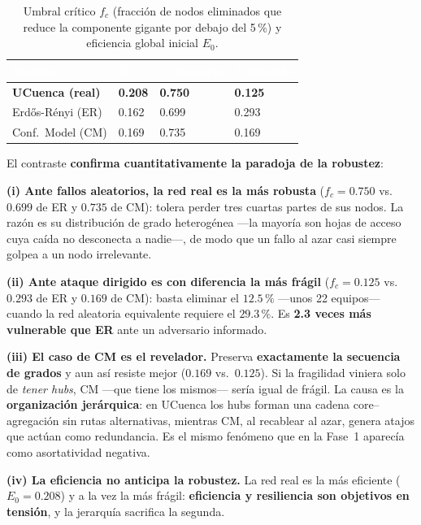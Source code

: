 \documentclass[11pt, a4paper]{article}
\newcommand{\encabezado}[1]{%
    \cellcolor{tabhead}\textcolor{white}{\textbf{#1}}}
\begin{document}
\begin{table}[htbp]
\centering
\caption{Umbral crítico $f_c$ (fracción de nodos eliminados que reduce la
         componente gigante por debajo del 5\,\%) y eficiencia global
         inicial $E_0$.}
\label{tab:percolacion_nulos}
\small
\begin{tabular}{L{3.4cm} C{2.4cm} C{2.6cm} C{2.6cm}}
    \toprule
    \encabezado{Modelo} & \encabezado{$E_0$} &
    \encabezado{$f_c$ aleatorio} & \encabezado{$f_c$ dirigido} \\
    \midrule
    \textbf{UCuenca (real)} & \textbf{0.208} & \textbf{0.750} & \textbf{0.125} \\
    Erdős-Rényi (ER)        & 0.162          & 0.699          & 0.293 \\
    Conf.\ Model (CM)       & 0.169          & 0.735          & 0.169 \\
    \bottomrule
\end{tabular}
\end{table}

El contraste \textbf{confirma cuantitativamente la paradoja de la robustez}:

\textbf{(i) Ante fallos aleatorios, la red real es la más robusta}
($f_c = 0.750$ vs.\ $0.699$ de ER y $0.735$ de CM): tolera perder tres
cuartas partes de sus nodos. La razón es su distribución de grado
heterogénea —la mayoría son hojas de acceso cuya caída no desconecta a
nadie—, de modo que un fallo al azar casi siempre golpea a un nodo
irrelevante.

\textbf{(ii) Ante ataque dirigido es con diferencia la más frágil}
($f_c = 0.125$ vs.\ $0.293$ de ER y $0.169$ de CM): basta eliminar el
$12.5\,\%$ —unos 22 equipos— cuando la red aleatoria equivalente requiere el
$29.3\,\%$. Es \textbf{2.3 veces más vulnerable que ER} ante un adversario
informado.

\textbf{(iii) El caso de CM es el revelador.} Preserva \textbf{exactamente
la secuencia de grados} y aun así resiste mejor ($0.169$ vs.\ $0.125$). Si
la fragilidad viniera solo de \textit{tener hubs}, CM —que tiene los
mismos— sería igual de frágil. La causa es la \textbf{organización
jerárquica}: en UCuenca los hubs forman una cadena core--agregación sin
rutas alternativas, mientras CM, al recablear al azar, genera atajos que
actúan como redundancia. Es el mismo fenómeno que en la Fase~1 aparecía
como asortatividad negativa.

\textbf{(iv) La eficiencia no anticipa la robustez.} La red real es la más
eficiente ($E_0 = 0.208$) y a la vez la más frágil: \textbf{eficiencia y
resiliencia son objetivos en tensión}, y la jerarquía sacrifica la segunda.
\end{document}

